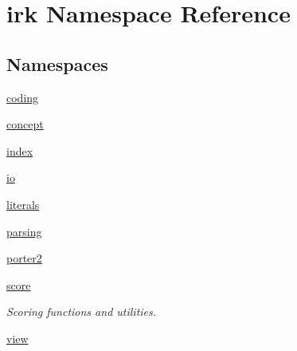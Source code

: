 \hypertarget{namespaceirk}{}\section{irk Namespace Reference}
\label{namespaceirk}
\subsection*{Namespaces}
\begin{DoxyCompactItemize}
\item 
 \mbox{\hyperlink{namespaceirk_1_1coding}{coding}}
\item 
 \mbox{\hyperlink{namespaceirk_1_1concept}{concept}}
\item 
 \mbox{\hyperlink{namespaceirk_1_1index}{index}}
\item 
 \mbox{\hyperlink{namespaceirk_1_1io}{io}}
\item 
 \mbox{\hyperlink{namespaceirk_1_1literals}{literals}}
\item 
 \mbox{\hyperlink{namespaceirk_1_1parsing}{parsing}}
\item 
 \mbox{\hyperlink{namespaceirk_1_1porter2}{porter2}}
\item 
 \mbox{\hyperlink{namespaceirk_1_1score}{score}}
\begin{DoxyCompactList}\small\item\em Scoring functions and utilities. \end{DoxyCompactList}\item 
 \mbox{\hyperlink{namespaceirk_1_1view}{view}}
\end{DoxyCompactItemize}
